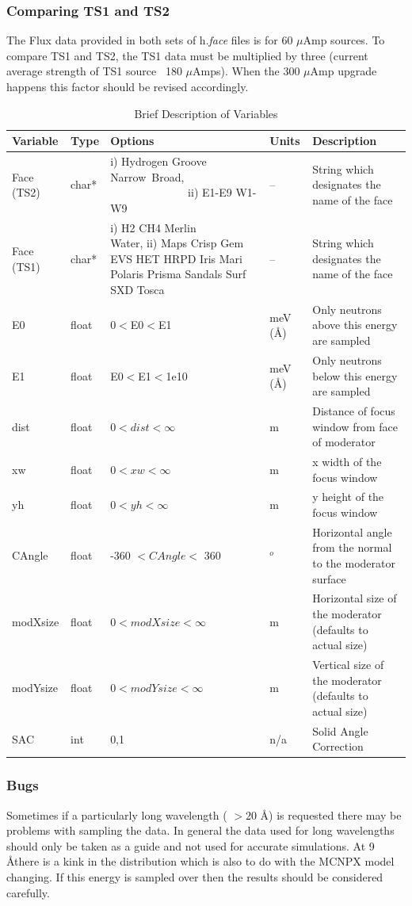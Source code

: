 \subsubsection{Comparing TS1 and TS2}
The Flux data provided in both sets of h.\textit{{face}} files is for 60 {$\mu$}Amp sources. To compare TS1 and TS2, the TS1 data must be multiplied by three (current average strength of TS1 source ~180 {$\mu$}Amps). When the 300 {$\mu$}Amp upgrade happens this factor should be revised accordingly.
\begin{table}[tbp]
\begin{center}
\begin{tabular}{|p{0.7in}|p{0.4in}|p{1.7in}|p{0.35in}|p{2.0in}|}
\hline
Variable & Type & Options & Units & Description \\
\hline Face (TS2) & char* &  i) Hydrogen Groove Narrow~Broad,
~~~~~~~~~~~~~~ii) E1-E9 W1-W9 & -- &
String which designates the name of the face \\
\hline Face (TS1) & char* &  i) H2 CH4 Merlin ~~~~~~ Water,  ii)
Maps Crisp Gem EVS HET HRPD Iris Mari Polaris Prisma Sandals Surf
SXD Tosca & -- &
String which designates the name of the face \\
\hline
E0 & float & 0$<$E0$<$E1 & meV (\AA) & Only neutrons above this energy are sampled
\\
E1 & float & E0$<$E1$<$1e10 & meV (\AA) & Only neutrons below this energy are
sampled \\
\hline
dist & float & $0< dist <\infty$ & m & Distance of focus window from
face of moderator \\
xw & float & $0<xw<\infty$ & m & x width of the focus window  \\
yh & float & $0<yh<\infty$ & m & y height of the focus window  \\
\hline
CAngle & float & -360 $< CAngle <$ 360 & $^o$ & Horizontal angle from
the normal to the moderator surface\\
\hline
modXsize & float & $0<modXsize<\infty$ & m & Horizontal size of the
moderator (defaults to actual size) \\
modYsize & float & $0<modYsize<\infty$ & m & Vertical size of the
moderator (defaults to actual size) \\
\hline
SAC & int & 0,1 & n/a & Solid Angle Correction \\
\hline
\end{tabular}
\caption{Brief Description of Variables}
\label{vars}
\end{center}
\end{table}

\subsubsection{Bugs}

Sometimes if a particularly long wavelength ( $> 20$ \AA) is requested there may be problems with sampling the data. In general the data used for long wavelengths should only be taken as a guide and not used for accurate simulations. At 9 \AA there is a kink in the distribution which is also to do with the MCNPX model changing. If this energy is sampled over then the results should be considered carefully.

